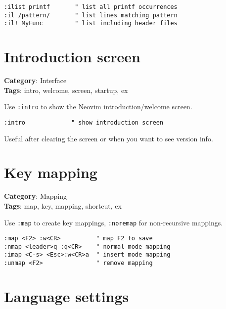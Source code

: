 {{{{{{\begin{Exa*}{}
\begin{Verbatim}[fontsize=\footnotesize, breaklines, breakanywhere]
:ilist printf       " list all printf occurrences
:il /pattern/       " list lines matching pattern
:il! MyFunc         " list including header files
\end{Verbatim}
\end{Exa*}

\section{Introduction screen}

\textbf{Category}: Interface\\ \textbf{Tags}: intro, welcome, screen, startup, ex
\vspace{0.5cm}

Use {\footnotesize \Verb§:intro§} to show the Neovim introduction/welcome screen.

\begin{Exa*}{}
\begin{Verbatim}[fontsize=\footnotesize, breaklines, breakanywhere]
:intro             " show introduction screen
\end{Verbatim}
\end{Exa*}

Useful after clearing the screen or when you want to see version info.

\section{Key mapping}

\textbf{Category}: Mapping\\ \textbf{Tags}: map, key, mapping, shortcut, ex
\vspace{0.5cm}

Use {\footnotesize \Verb§:map§} to create key mappings, {\footnotesize \Verb§:noremap§} for non-recursive mappings.

\begin{Exa*}{}
\begin{Verbatim}[fontsize=\footnotesize, breaklines, breakanywhere]
:map <F2> :w<CR>          " map F2 to save
:nmap <leader>q :q<CR>    " normal mode mapping
:imap <C-s> <Esc>:w<CR>a  " insert mode mapping
:unmap <F2>               " remove mapping
\end{Verbatim}
\end{Exa*}

\section{Language settings}

}}}}}}
